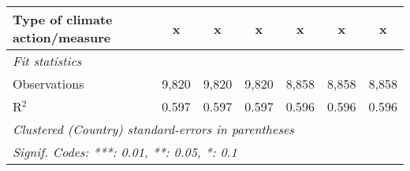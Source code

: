 \begin{tabular}{lcccccc}
   Type of climate action/measure                     & x       & x       & x       & x             & x            & x\\  
   \midrule \emph{Fit statistics}\\
   Observations                                       & 9,820   & 9,820   & 9,820   & 8,858         & 8,858        & 8,858\\  
   R$^2$                                              & 0.597   & 0.597   & 0.597   & 0.596         & 0.596        & 0.596\\  
   \midrule
   \multicolumn{7}{l}{\emph{Clustered (Country) standard-errors in parentheses}}\\
   \multicolumn{7}{l}{\emph{Signif. Codes: ***: 0.01, **: 0.05, *: 0.1}}\\
\end{tabular}
\par\endgroup


